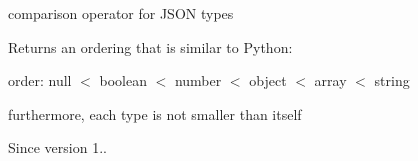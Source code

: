 comparison operator for J\+S\+ON types 

Returns an ordering that is similar to Python\+:
\begin{DoxyItemize}
\item order\+: null $<$ boolean $<$ number $<$ object $<$ array $<$ string
\item furthermore, each type is not smaller than itself
\end{DoxyItemize}

\begin{DoxySince}{Since}
version 1.. 
\end{DoxySince}
